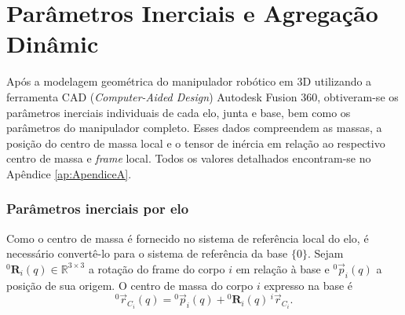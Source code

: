 

\chapter{Parâmetros Inerciais e Agregação Dinâmic}
\label{ApendiceC}
Após a modelagem geométrica do manipulador robótico em 3D utilizando a ferramenta CAD (\emph{Computer-Aided Design}) Autodesk Fusion 360, obtiveram-se os parâmetros inerciais individuais de cada elo, junta e base, bem como os parâmetros do manipulador completo.
Esses dados compreendem as massas, a posição do centro de massa local e o tensor de inércia em relação ao respectivo centro de massa e \emph{frame} local. Todos os valores detalhados encontram-se no Apêndice \eqref{ap:ApendiceA}.

\subsection{Parâmetros inerciais por elo}
Como o centro de massa é fornecido no sistema de referência local do elo, é necessário convertê-lo para o sistema de referência da base $\{0\}$.
Sejam ${}^{0}\!\mathbf R_i(q)\in\mathbb{R}^{3\times 3}$ a rotação do frame do corpo $i$ em relação à base e ${}^{0}\!\vec p_i(q)$ a posição de sua origem. O centro de massa do corpo $i$ expresso na base é
\begin{equation}
{}^{0}\!\vec r_{C_i}(q)= {}^{0}\!\vec p_i(q)+{}^{0}\!\mathbf R_i(q)\,{}^{i}\!\vec r_{C_i}.
\label{eq:rci_base}
\end{equation}

